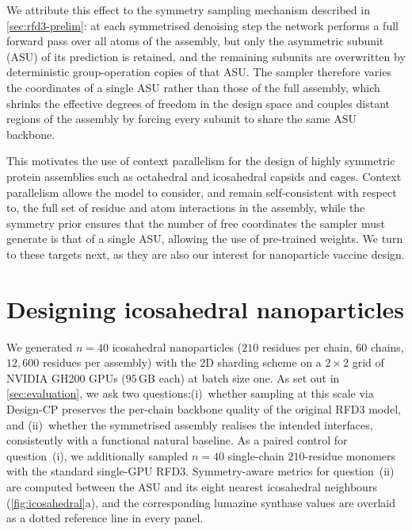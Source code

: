 We attribute this effect to the symmetry sampling mechanism described in
\cref{sec:rfd3-prelim}: at each symmetrised denoising step the network
performs a full forward pass over all atoms of the assembly, but only the
asymmetric subunit (ASU) of its prediction is retained, and the remaining subunits
are overwritten by deterministic group-operation copies of that ASU. The sampler
therefore varies the coordinates of a single ASU rather than those of the full
assembly, which shrinks the effective degrees of freedom in the design space and
couples distant regions of the assembly by forcing every subunit to share the same
ASU backbone.

This motivates the use of context parallelism for the design of highly symmetric
protein assemblies such as octahedral and icosahedral capsids and cages. Context
parallelism allows the model to consider, and remain self-consistent with respect
to, the full set of residue and atom interactions in the assembly, while the
symmetry prior ensures that the number of free coordinates the sampler must
generate is that of a single ASU, allowing the use of pre-trained weights.
We turn to these targets next, as they are also our interest for nanoparticle vaccine design.

\section{Designing icosahedral nanoparticles}
\label{sec:icosahedral}

We generated $n{=}40$ icosahedral nanoparticles ($210$ residues per chain, $60$
chains, $12{,}600$ residues per assembly) with the 2D sharding scheme on a
$2\times2$ grid of NVIDIA GH200 GPUs ($95\,$GB each) at batch size one. As set out 
in \cref{sec:evaluation}, we ask two questions:(i)~whether sampling at this
scale via Design-CP preserves the per-chain backbone quality of the original
RFD3 model, and (ii)~whether the symmetrised assembly realises the intended
interfaces, consistently with a functional natural baseline. As a paired control
for question~(i), we additionally sampled $n{=}40$ single-chain $210$-residue
monomers with the standard single-GPU RFD3. Symmetry-aware metrics for
question~(ii) are computed between the ASU and its eight nearest icosahedral
neighbours (\cref{fig:icosahedral}a), and the corresponding lumazine
synthase values are overlaid as a dotted reference line in every panel.


